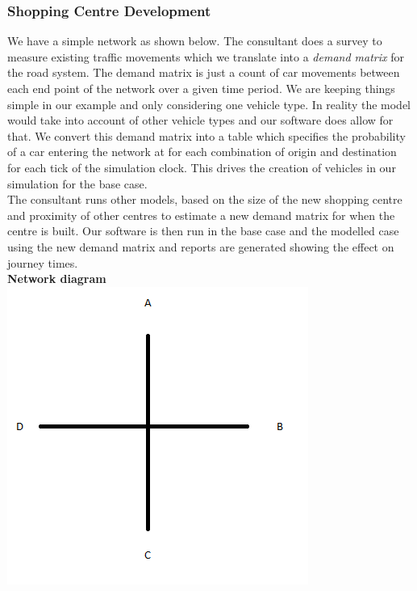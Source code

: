 \subsubsection{Shopping Centre Development}
We have a simple network as shown below.  The consultant does a survey to measure existing traffic movements which we translate into a \textit{demand matrix} for the road system.  The demand matrix is just a count of car movements between each end point of the network over a given time period.  We are keeping things simple in our example and only considering one vehicle type.  In reality the model would take into account of other vehicle types and our software does allow for that.  We convert this demand matrix into a table which specifies the probability of a car entering the network at for each combination of origin and destination for each tick of the simulation clock.  This drives the creation of vehicles in our simulation for the base case.  \\ The consultant runs other models, based on the size of the new shopping centre and proximity of other centres to estimate a new demand matrix for when the centre is built.  Our software is then run in the base case and the modelled case using the new demand matrix and reports are generated showing the effect on journey times.\\  \newpage \textbf{Network diagram}\\
\includegraphics[scale=0.5]{./images/network.png}

